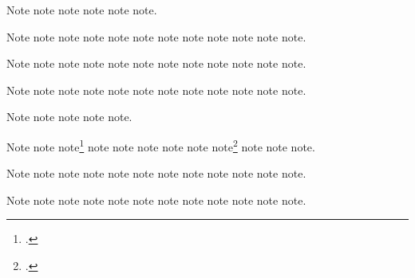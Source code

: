 \documentclass[a4paper,12pt]{report}
\begin{document}
Note\autocite{murphy:silent} note\autocite{nass:address}
note\autocite{nyt:obittrevor} note\autocite{nyt:trevorobit}
note\autocite{nytrumpet:art:15} note\autocite{osborne:poison}.


Note\autocite{oed:cdrom} note\autocite{natrecoff:camera}
note\autocite{palmatary:pottery} note\autocite{nyt:obittrevor}
note\autocite{nyt:trevorobit} note\autocite[arithmetical]{oed:cdrom}
note\autocite{nytrumpet:art:15} note\autocite{pelikan:christian}
note\autocite{petroff:impurity} note\autocite{osborne:poison}
note\autocite{phibbs:diary} note\autocite{palmatary:pottery}.

Note\autocite{pirumova} note\autocite{pelikan:christian}
note\autocite{petroff:impurity} note\autocite{plato:republic:gr}
note\autocite{polakow:afterw} note\autocite{phibbs:diary}
note\autocite[360e--361b]{plato:republic:gr} note\autocite{pirumova}
note\autocite{polakow:afterw} note\autocite{powell:email}
note\autocite{prose:intro} note\autocite{ratliff:review}.

Note\autocite{reaves:rosen} note\autocite{powell:email}
note\autocite{prose:intro} note\autocite{rodman:walk}
note\autocite{ross:thesis} note\autocite{ratliff:review}
note\autocite{rozner:liberation} note\autocite{schellinger:novel}
note\autocite{reaves:rosen} note\autocite{schubert:muellerin}
note\autocite{rodman:walk} note\autocite{schweitzer:bach}.

Note\autocite{ross:thesis} note\autocite{rozner:liberation}
note\autocite{sechzer:women} note\autocite{schellinger:novel}
note\autocite{sereny:cries}.


Note\autocite{schubert:muellerin} note\autocite{schweitzer:bach}
note\footnote{.}
note\autocite{shapey:partita} note\autocite{sechzer:women}
note\autocite{sirosh:visualcortex} note\autocite{sereny:cries}
note\autocite{silver:gawain}
note\footnote{.}
note\autocite{soltes:georgia} note\autocite{sirosh:visualcortex}
note\autocite{spock:interview}.

Note\autocite{shapey:partita} note\autocite{stenger:privacy}
note\autocite{silver:gawain} note\autocite{tillich:system}
note\autocite{soltes:georgia} note\autocite{spock:interview}
note\autocite{times:guide} note\autocite{twain:audio}
note\autocite{virginia:plantation} note\autocite{stenger:privacy}
note\autocite{chicago:manual:15} note\autocite{twain:audio}.

Note\autocite[2:45]{tillich:system} note\autocite[police
ranks]{times:guide}  note\autocite{virginia:plantation}
note\autocite{chicago:manual:15} note\autocite{unsigned:ranke:15}
note\autocite{herwign:office} note\autocite{verdi:corsaro}
note\autocite{wallraff:word} note\autocite{unsigned:ranke:15}
note\autocite{warr:ellison} note\autocite{herwign:office}
note\autocite{wallraff:word}.
\end{document}
